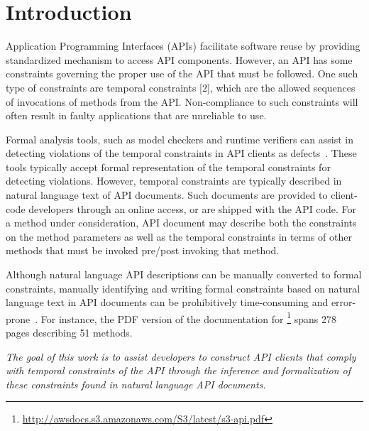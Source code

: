 \section{Introduction}
\label{sec:introduction}

Application Programming Interfaces (APIs) facilitate software reuse
by providing standardized mechanism to access API components.
However, an API has some constraints governing the proper use of the API that must be followed.
One such type of constraints are temporal constraints [2], which are the allowed sequences of invocations of methods from the API.
Non-compliance to such constraints will often result in faulty applications that are unreliable to use. %

Formal analysis tools, such as model checkers and runtime verifiers 
can assist in detecting violations of the temporal constraints
in API clients as defects~\cite{lee2012towards}.
These tools typically accept formal representation of the temporal constraints for detecting violations.
However, temporal constraints are typically described in natural language text of API documents.
Such documents are provided to client-code developers through an online access, or are shipped with the API code.
For a method under consideration, API document may describe both the constraints on the method parameters
as well as the temporal constraints in terms of other methods that must be invoked pre/post invoking that method.

Although natural language API descriptions can be manually converted to formal constraints,
manually identifying and writing formal constraints based on natural language text in API documents can be prohibitively time-consuming and error-prone~\cite{wu2013inferring,RubingerWEB10}. 
For instance, the PDF version of the documentation for \amazonAPI\footnote{{\small \url{http://awsdocs.s3.amazonaws.com/S3/latest/s3-api.pdf}}} spans 278 pages describing 51 methods.

\textit{The goal of this work is to assist developers to construct API clients that comply with temporal constraints of the API through the inference and formalization of these constraints found in natural language API documents.}


